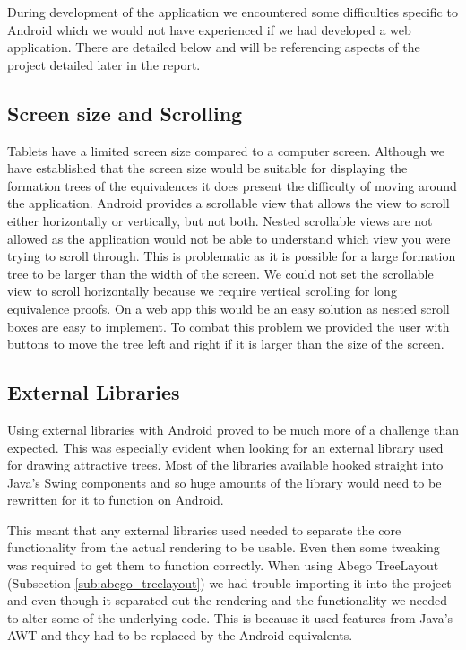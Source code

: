 \documentclass{report}
\begin{document}
During development of the application we encountered some difficulties specific to Android which we would not have experienced if we had developed a web application. There are detailed below and will be referencing aspects of the project detailed later in the report.

\subsection{Screen size and Scrolling}

Tablets have a limited screen size compared to a computer screen. Although we have established that the screen size would be suitable for displaying the formation trees of the equivalences it does present the difficulty of moving around the application. Android provides a scrollable view that allows the view to scroll either horizontally or vertically, but not both. Nested scrollable views are not allowed as the application would not be able to understand which view you were trying to scroll through. This is problematic as it is possible for a large formation tree to be larger than the width of the screen. We could not set the scrollable view to scroll horizontally because we require vertical scrolling for long equivalence proofs. On a web app this would be an easy solution as nested scroll boxes are easy to implement. To combat this problem we provided the user with buttons to move the tree left and right if it is larger than the size of the screen.

\subsection{External Libraries}
\label{sub:external_libraries}

Using external libraries with Android proved to be much more of a challenge than expected. This was especially evident when looking for an external library used for drawing attractive trees. Most of the libraries available hooked straight into Java's Swing components and so huge amounts of the library would need to be rewritten for it to function on Android.

This meant that any external libraries used needed to separate the core functionality from the actual rendering to be usable. Even then some tweaking was required to get them to function correctly. When using Abego TreeLayout (Subsection \ref{sub:abego_treelayout}) we had trouble importing it into the project and even though it separated out the rendering and the functionality we needed to alter some of the underlying code. This is because it used features from Java's AWT and they had to be replaced by the Android equivalents. 
\end{document}
